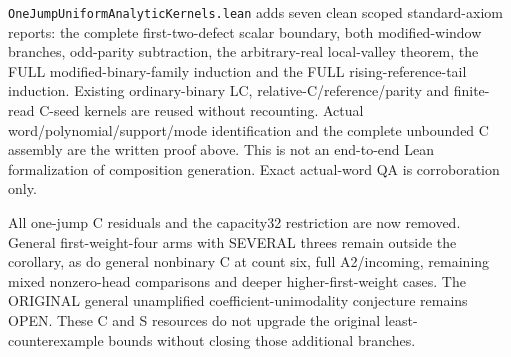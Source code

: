 \texttt{OneJumpUniformAnalyticKernels.lean} adds seven clean scoped
standard-axiom reports: the complete first-two-defect scalar boundary,
both modified-window branches, odd-parity subtraction, the arbitrary-real
local-valley theorem, the FULL modified-binary-family induction and the
FULL rising-reference-tail induction.  Existing ordinary-binary LC,
relative-C/reference/parity and finite-read C-seed kernels are reused
without recounting.  Actual word/polynomial/support/mode identification
and the complete unbounded C assembly are the written proof above.
This is not an end-to-end Lean formalization of composition generation.
Exact actual-word QA is corroboration only.

All one-jump C residuals and the capacity32 restriction are now removed.
General first-weight-four arms with SEVERAL threes remain outside
the corollary, as do general nonbinary C at count six, full A2/incoming,
remaining mixed nonzero-head comparisons and deeper higher-first-weight
cases.  The ORIGINAL general unamplified coefficient-unimodality
conjecture remains OPEN.  These C and S resources do not upgrade
the original least-counterexample bounds without closing those
additional branches.
